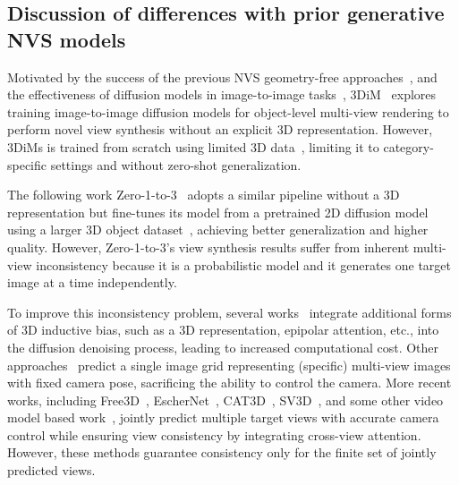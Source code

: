\subsection{Discussion of differences with prior generative NVS models}
\label{appendix: diff_from_generative_model}


Motivated by the success of the previous NVS geometry-free approaches~\citep{sitzmann2021lightfieldnetwork,sajjadi2022srt}, and the effectiveness of diffusion models in image-to-image tasks~\citep{saharia2022palette,ramesh2022hierarchical,saharia2022image}, 3DiM~\citep{watson2022novel} explores training image-to-image diffusion models for object-level multi-view rendering to perform novel view synthesis without an explicit 3D representation. 
However, 3DiMs is trained from scratch using limited 3D data~\citep{sitzmann2019scene}, limiting it to category-specific settings and without zero-shot generalization.

The following work Zero-1-to-3~\citep{liu2023zero1to3} adopts a similar pipeline without a 3D representation but fine-tunes its model from a pretrained 2D diffusion model using a larger 3D object dataset~\citep{deitke2023objaverse}, achieving better generalization and higher quality. 
However, Zero-1-to-3’s view synthesis results suffer from inherent multi-view inconsistency because it is a probabilistic model and it generates one target image at a time independently. 

To improve this inconsistency problem, several works~\citep{liu2023syncdreamer, yang2023consistnet, ye2023consistent, tung2024megascenes} integrate additional forms of 3D inductive bias, such as a 3D representation, epipolar attention, etc., into the diffusion denoising process, leading to increased computational cost. 
Other approaches~\citep{li2023instant3d,shi2023zero123plus,shi2023MVDream,long2023wonder3d} predict a single image grid representing (specific) multi-view images with fixed camera pose, sacrificing the ability to control the camera. More recent works, including Free3D~\citep{zheng2024free3d}, EscherNet~\citep{kong2024eschernet}, CAT3D~\citep{gao2024cat3d}, SV3D~\citep{voleti2025sv3d}, and some other video model based work~\citep{wang2024motionctrl, he2024cameractrl, yu2024viewcrafter,yan2024streetcrafterstreetviewsynthesis}, jointly predict multiple target views with accurate camera control while ensuring view consistency by integrating cross-view attention.  However, these methods guarantee consistency only for the finite set of jointly predicted views.

